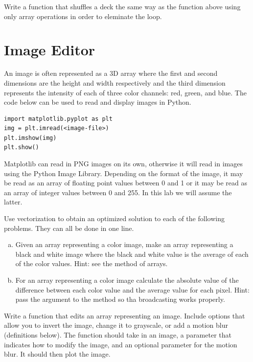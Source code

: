 \begin{problem}
Write a function that shuffles a deck the same way as the function above using only array operations in order to eleminate the loop.
\end{problem}

\section*{Image Editor}
An image is often represented as a 3D array where the first and second dimensions are the height and width respectively and the third dimension represents the intensity of each of three color channels: red, green, and blue.
The code below can be used to read and display images in Python.
\begin{lstlisting}
import matplotlib.pyplot as plt
img = plt.imread(<image-file>)
plt.imshow(img)
plt.show()
\end{lstlisting}

Matplotlib can read in PNG images on its own, otherwise it will read in images using the Python Image Library.
Depending on the format of the image, it may be read as an array of floating point values between 0 and 1 or it may be read as an array of integer values between 0 and 255.
In this lab we will assume the latter.

\begin{problem}
Use vectorization to obtain an optimized solution to each of the following problems.
They can all be done in one line.
\begin{enumerate}[a)]

\item Given an array representing a color image, make an array representing a black and white image where the black and white value is the average of each of the color values.
Hint: see the  method of arrays.

\item For an array representing a color image calculate the absolute value of the difference between each color value and the average value for each pixel.
Hint: pass the  argument to the  method so tha broadcasting works properly.

\end{enumerate}
\end{problem}

\begin{problem}
Write a function that edits an array representing an image.
Include options that allow you to  invert the image, change it to grayscale, or add a motion blur (definitions below).
The function should take in an image, a parameter that indicates how to modify the image, and an optional parameter for the motion blur.
It should then plot the image.
\end{problem}

